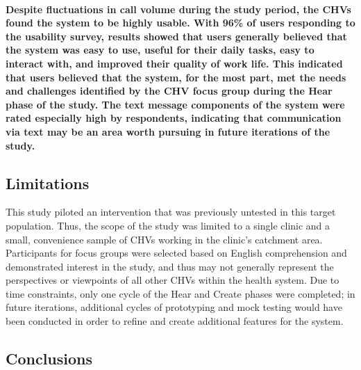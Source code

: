 \paragraph{Despite fluctuations in call volume during the study period, the CHVs found the system to be highly usable. With 96\% of users responding to the usability survey, results showed that users generally believed that the system was easy to use, useful for their daily tasks, easy to interact with, and improved their quality of work life. This indicated that users believed that the system, for the most part, met the needs and challenges identified by the CHV focus group during the Hear phase of the study. The text message components of the system were rated especially high by respondents, indicating that communication via text may be an area worth pursuing in future iterations of the study.}

\subsection{Limitations}
This study piloted an intervention that was previously untested in this target population. Thus, the scope of the study was limited to a single clinic and a small, convenience sample of CHVs working in the clinic's catchment area. Participants for focus groups were selected based on English comprehension and demonstrated interest in the study, and thus may not generally represent the perspectives or viewpoints of all other CHVs within the health system. Due to time constraints, only one cycle of the Hear and Create phases were completed; in future iterations, additional cycles of prototyping and mock testing would have been conducted in order to refine and create additional features for the system.  

%

\subsection{Conclusions}